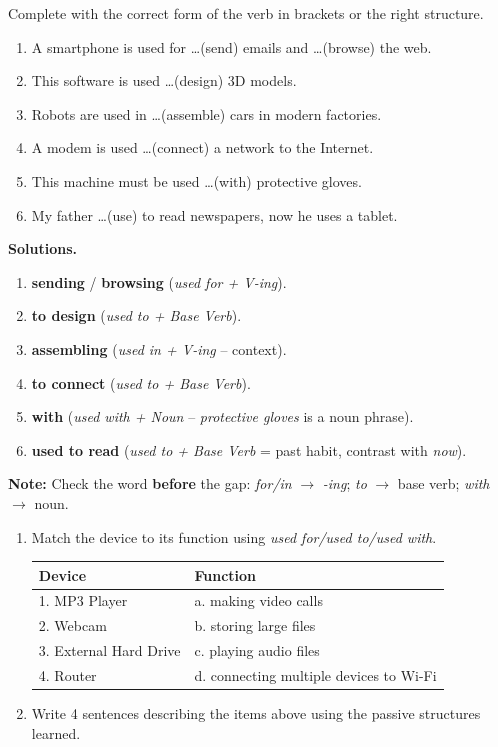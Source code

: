 \documentclass[11pt]{article}
\begin{document}
\begin{exoresolu}
Complete with the correct form of the verb in brackets or the right structure.
\begin{enumerate}
\item A smartphone is used for \dots (send) emails and \dots (browse) the web.
\item This software is used \dots (design) 3D models.
\item Robots are used in \dots (assemble) cars in modern factories.
\item A modem is used \dots (connect) a network to the Internet.
\item This machine must be used \dots (with) protective gloves.
\item My father \dots (use) to read newspapers, now he uses a tablet.
\end{enumerate}
\tcblower
\textbf{Solutions.}
\begin{enumerate}
\item \textbf{sending} / \textbf{browsing} (\emph{used for + V-ing}).
\item \textbf{to design} (\emph{used to + Base Verb}).
\item \textbf{assembling} (\emph{used in + V-ing} -- context).
\item \textbf{to connect} (\emph{used to + Base Verb}).
\item \textbf{with} (\emph{used with + Noun} -- \emph{protective gloves} is a noun phrase).
\item \textbf{used to read} (\emph{used to + Base Verb} = past habit, contrast with \emph{now}).
\end{enumerate}
\textbf{Note:} Check the word \textbf{before} the gap: \emph{for/in} $\rightarrow$ \emph{-ing}; \emph{to} $\rightarrow$ base verb; \emph{with} $\rightarrow$ noun.
\end{exoresolu}

\begin{exercice}
\begin{enumerate}
\item Match the device to its function using \emph{used for/used to/used with}.
\begin{center}
\begin{tabular}{|l|l|}\hline
\textbf{Device} & \textbf{Function} \\ \hline
1. MP3 Player & a. making video calls \\ \hline
2. Webcam & b. storing large files \\ \hline
3. External Hard Drive & c. playing audio files \\ \hline
4. Router & d. connecting multiple devices to Wi-Fi \\ \hline
\end{tabular}
\end{center}
\item Write 4 sentences describing the items above using the passive structures learned.
\end{enumerate}
\end{exercice}
\end{document}
